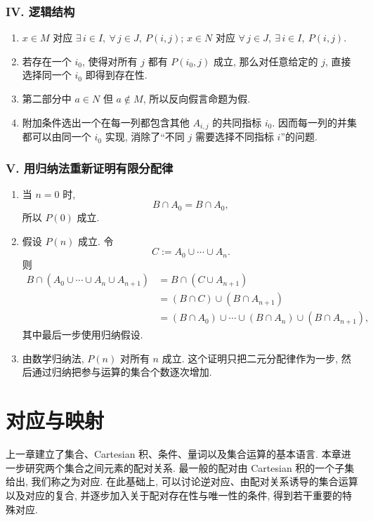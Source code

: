 \documentclass[usesamecnt, thmcnt=section, lang=cn, newtx, 10pt, scheme=chinese]{elegantbook}
\begin{document}
\subsection*{IV. 逻辑结构}
\begin{enumerate}[label=\textbf{\arabic*.}, start=15]
  \item $x\in M$ 对应 $\exists\,i\in I,\ \forall\,j\in J,\ P(i,j)$; $x\in N$ 对应 $\forall\,j\in J,\ \exists\,i\in I,\ P(i,j)$.
  \item 若存在一个 $i_0$, 使得对所有 $j$ 都有 $P(i_0,j)$ 成立, 那么对任意给定的 $j$, 直接选择同一个 $i_0$ 即得到存在性.
  \item 第二部分中 $a\in N$ 但 $a\notin M$, 所以反向假言命题为假.
  \item 附加条件选出一个在每一列都包含其他 $A_{i,j}$ 的共同指标 $i_0$. 因而每一列的并集都可以由同一个 $i_0$ 实现, 消除了``不同 $j$ 需要选择不同指标 $i$''的问题.
\end{enumerate}


\subsection*{V. 用归纳法重新证明有限分配律}
\begin{enumerate}[label=\textbf{\arabic*.}, start=19]
  \item 当 $n=0$ 时,
  \[
   B\cap A_0=B\cap A_0,
  \]
  所以 $P(0)$ 成立.
  \item 假设 $P(n)$ 成立. 令
  \[
   C:=A_0\cup\cdots\cup A_n.
  \]
  则
  \[
   \begin{aligned}
    B\cap(A_0\cup\cdots\cup A_n\cup A_{n+1})
    &=B\cap(C\cup A_{n+1})\\
    &=(B\cap C)\cup(B\cap A_{n+1})\\
    &=(B\cap A_0)\cup\cdots\cup(B\cap A_n)\cup(B\cap A_{n+1}),
   \end{aligned}
  \]
  其中最后一步使用归纳假设.
  \item 由数学归纳法, $P(n)$ 对所有 $n$ 成立. 这个证明只把二元分配律作为一步, 然后通过归纳把参与运算的集合个数逐次增加.
\end{enumerate}

\chapter{对应与映射}

上一章建立了集合、Cartesian 积、条件、量词以及集合运算的基本语言. 本章进一步研究两个集合之间元素的配对关系. 最一般的配对由 Cartesian 积的一个子集给出, 我们称之为对应. 在此基础上, 可以讨论逆对应、由配对关系诱导的集合运算以及对应的复合, 并逐步加入关于配对存在性与唯一性的条件, 得到若干重要的特殊对应.
\end{document}
